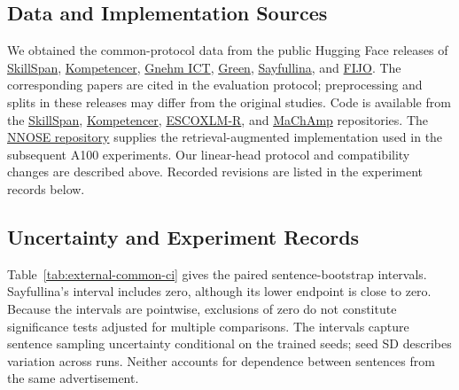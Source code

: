 \subsection{Data and Implementation Sources}
We obtained the common-protocol data from the public Hugging Face releases of
\href{https://huggingface.co/datasets/jjzha/skillspan}{SkillSpan},
\href{https://huggingface.co/datasets/jjzha/kompetencer}{Kompetencer},
\href{https://huggingface.co/datasets/jjzha/gnehm}{Gnehm ICT},
\href{https://huggingface.co/datasets/jjzha/green}{Green},
\href{https://huggingface.co/datasets/jjzha/sayfullina}{Sayfullina}, and
\href{https://huggingface.co/datasets/jjzha/fijo}{FIJO}.
The corresponding papers are cited in the evaluation protocol; preprocessing and splits in these releases may differ from the original studies. Code is available from the
\href{https://github.com/kris927b/SkillSpan}{SkillSpan},
\href{https://github.com/jjzha/kompetencer}{Kompetencer},
\href{https://github.com/mainlp/escoxlmr}{ESCOXLM-R}, and
\href{https://github.com/machamp-nlp/machamp}{MaChAmp} repositories.
The \href{https://github.com/jjzha/nnose}{NNOSE repository} supplies the retrieval-augmented implementation used in the subsequent A100 experiments.
Our linear-head protocol and compatibility changes are described above. Recorded revisions are listed in the experiment records below.

\subsection{Uncertainty and Experiment Records}
Table~\ref{tab:external-common-ci} gives the paired sentence-bootstrap intervals. Sayfullina's interval includes zero, although its lower endpoint is close to zero. Because the intervals are pointwise, exclusions of zero do not constitute significance tests adjusted for multiple comparisons. The intervals capture sentence sampling uncertainty conditional on the trained seeds; seed SD describes variation across runs. Neither accounts for dependence between sentences from the same advertisement.

